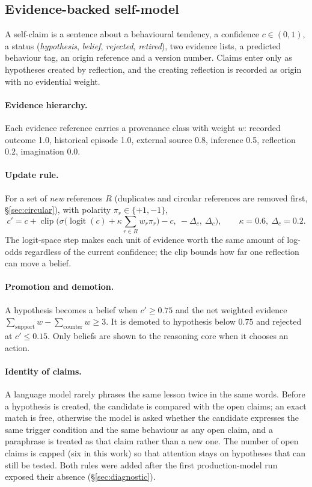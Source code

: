 \documentclass[11pt]{article}
\begin{document}
\subsection{Evidence-backed self-model}\label{sec:selfmodel}
A self-claim is a sentence about a behavioural tendency, a confidence $c\in(0,1)$, a status (\emph{hypothesis}, \emph{belief}, \emph{rejected}, \emph{retired}), two evidence lists, a predicted behaviour tag, an origin reference and a version number. Claims enter only as hypotheses created by reflection, and the creating reflection is recorded as origin with no evidential weight.

\paragraph{Evidence hierarchy.} Each evidence reference carries a provenance class with weight $w$: recorded outcome 1.0, historical episode 1.0, external source 0.8, inference 0.5, reflection 0.2, imagination 0.0.

\paragraph{Update rule.} For a set of \emph{new} references $R$ (duplicates and circular references are removed first, \S\ref{sec:circular}), with polarity $\pi_r\in\{+1,-1\}$,
\begin{equation}
c' = c + \operatorname{clip}\!\Big(\sigma\big(\operatorname{logit}(c)+\kappa\textstyle\sum_{r\in R} w_r\pi_r\big)-c,\ -\Delta_c,\ \Delta_c\Big),
\qquad \kappa=0.6,\ \Delta_c=0.2 .
\end{equation}
The logit-space step makes each unit of evidence worth the same amount of log-odds regardless of the current confidence; the clip bounds how far one reflection can move a belief.

\paragraph{Promotion and demotion.} A hypothesis becomes a belief when $c'\ge0.75$ and the net weighted evidence $\sum_{\text{support}} w-\sum_{\text{counter}} w\ge3$. It is demoted to hypothesis below $0.75$ and rejected at $c'\le0.15$. Only beliefs are shown to the reasoning core when it chooses an action.

\paragraph{Identity of claims.} A language model rarely phrases the same lesson twice in the same words. Before a hypothesis is created, the candidate is compared with the open claims; an exact match is free, otherwise the model is asked whether the candidate expresses the same trigger condition and the same behaviour as any open claim, and a paraphrase is treated as that claim rather than a new one. The number of open claims is capped (six in this work) so that attention stays on hypotheses that can still be tested. Both rules were added after the first production-model run exposed their absence (\S\ref{sec:diagnostic}).
\end{document}
